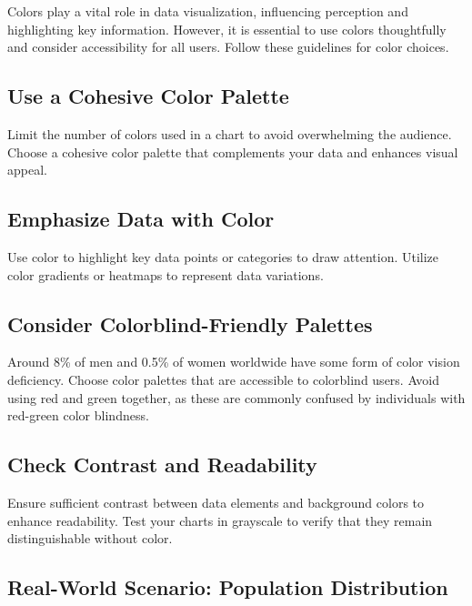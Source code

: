 \documentclass[
]{book}
\begin{document}
Colors play a vital role in data visualization, influencing perception and highlighting key information. However, it is essential to use colors thoughtfully and consider accessibility for all users. Follow these guidelines for color choices.

\hypertarget{use-a-cohesive-color-palette}{%
\subsection{Use a Cohesive Color Palette}\label{use-a-cohesive-color-palette}}

Limit the number of colors used in a chart to avoid overwhelming the audience.
Choose a cohesive color palette that complements your data and enhances visual appeal.

\hypertarget{emphasize-data-with-color}{%
\subsection{Emphasize Data with Color}\label{emphasize-data-with-color}}

Use color to highlight key data points or categories to draw attention.
Utilize color gradients or heatmaps to represent data variations.

\hypertarget{consider-colorblind-friendly-palettes}{%
\subsection{Consider Colorblind-Friendly Palettes}\label{consider-colorblind-friendly-palettes}}

Around 8\% of men and 0.5\% of women worldwide have some form of color vision deficiency. Choose color palettes that are accessible to colorblind users.
Avoid using red and green together, as these are commonly confused by individuals with red-green color blindness.

\hypertarget{check-contrast-and-readability}{%
\subsection{Check Contrast and Readability}\label{check-contrast-and-readability}}

Ensure sufficient contrast between data elements and background colors to enhance readability.
Test your charts in grayscale to verify that they remain distinguishable without color.

\hypertarget{real-world-scenario-population-distribution}{%
\subsection{Real-World Scenario: Population Distribution}\label{real-world-scenario-population-distribution}}
\end{document}
